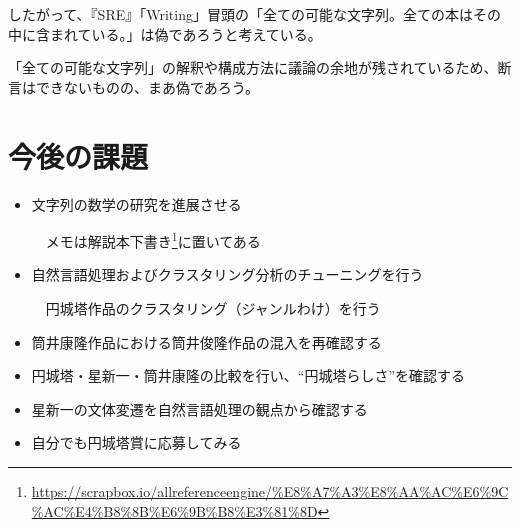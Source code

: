 \documentclass[10pt, a5paper, twoside]{jsarticle}
\theoremstyle{definition}
\begin{document}
		したがって、『SRE』「Writing」冒頭の「全ての可能な文字列。全ての本はその中に含まれている。」は偽であろうと考えている。

		「全ての可能な文字列」の解釈や構成方法に議論の余地が残されているため、断言はできないものの、まあ偽であろう。

	\section{今後の課題}

		\begin{itemize}

			\item 文字列の数学の研究を進展させる

			\vspace{1mm}

			　メモは解説本下書き\footnote{\url{https://scrapbox.io/allreferenceengine/%E8%A7%A3%E8%AA%AC%E6%9C%AC%E4%B8%8B%E6%9B%B8%E3%81%8D}}に置いてある

			\vspace{2mm}

			\item 自然言語処理およびクラスタリング分析のチューニングを行う

			\vspace{1mm}

			　円城塔作品のクラスタリング（ジャンルわけ）を行う

			\item 筒井康隆作品における筒井俊隆作品の混入を再確認する

			\vspace{2mm}

			\item 円城塔・星新一・筒井康隆の比較を行い、“円城塔らしさ”を確認する

			\vspace{2mm}

			\item 星新一の文体変遷を自然言語処理の観点から確認する

			\vspace{2mm}

			\item 自分でも円城塔賞に応募してみる

		\end{itemize}
\end{document}
